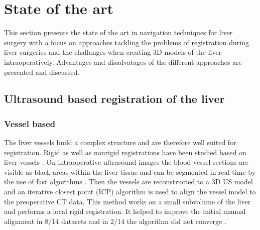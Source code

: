 \chapter{State of the art}
This section presents the state of the art in navigation techniques for liver
surgery with a focus on approaches tackling the problems of registration during
liver surgeries and the challanges when creating 3D models of the liver
intraoperatively. Advantages and disadvatages of the different approaches are
presented and discussed.
\section{Ultrasound based registration of the liver}
\label{sec:ultrasoundBasedRegistration}


\subsection{Vessel based}
The liver vessels build a complex structure and are
therefore well suited for registration. Rigid as well as nonrigid registrations
have been studied based on liver vessels \cite{ribes2012image}\cite{lange20093d}. 
On intraoperative ultrasound images the
blood vessel sections are visible as black areas within the liver tissue and can
be segmented in real time by the use of fast algorithms \cite{ribes2012image}. Then the
vessels are 
reconstructed to a 3D US model and an iterative closest point (ICP) algorithm is used to align the vessel model to
the preoperative CT data. This method works on a small subvolume of the liver
and performs a local rigid registration. It helped to improve the
initial manual alignment in 8/14 datasets and in 2/14 the algorithm did not
converge \cite{ribes2012image}.


